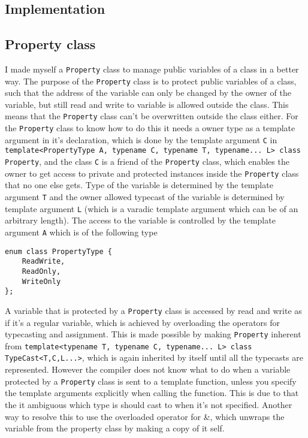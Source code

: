 \documentclass[11pt,english,a4paper]{article}
\begin{document}
\begin{flushleft}
\section{Implementation}

\subsection{Property class}

I made myself a \texttt{Property} class to manage public variables of a class in a better way. The purpose of the \texttt{Property} class is to protect public variables of a class, such that the address of the variable can only be changed by the owner of the variable, but still read and write to variable is allowed outside the class. This means that the \texttt{Property} class can't be overwritten outside the class either. For the  \texttt{Property} class to know how to do this it needs a owner type as a template argument in it's declaration, which is done by the template argument \texttt{C} in \texttt{
template<PropertyType A, typename C, typename T, typename... L> class Property}, and the class \texttt{C} is a friend of the \texttt{Property} class, which enables the owner to get access to private and protected instances inside the \texttt{Property} class that no one else gets. Type of the variable is determined by the template argument \texttt{T} and the owner allowed typecast of the variable is determined by template argument \texttt{L} (which is a varadic template argument which can be of an arbitrary length). The access to the variable is controlled by the template argument \texttt{A} which is of the following type

\begin{lstlisting}[title={\texttt{enum class PropertyType}}]
enum class PropertyType {
	ReadWrite,
	ReadOnly,
	WriteOnly
};
\end{lstlisting}

A variable that is protected by a \texttt{Property} class is accessed by read and write as if it's a regular variable, which is achieved by overloading the operators for typecasting and assignment. This is made possible by making \texttt{Property} inherent from \texttt{template<typename T, typename C, typename... L> class TypeCast<T,C,L...>}, which is again inherited by itself until all the typecasts are represented. However the compiler does not know what to do when a variable protected by a \texttt{Property} class is sent to a template function, unless you specify the template arguments explicitly when calling the function. This is due to that the it ambiguous which type is should cast to when it's not specified. Another way to resolve this to use the overloaded operator for \&, which unwraps the variable from the property class by making a copy of it self. \linebreak


\end{flushleft}
\end{document}
